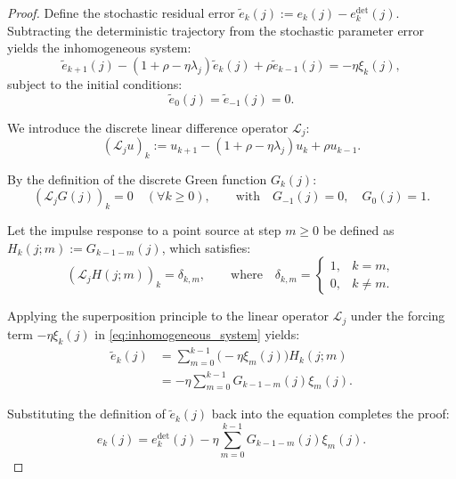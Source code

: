 \documentclass[11pt]{article}
\begin{document}
\begin{proof}

Define the stochastic residual error $\tilde{e}_k(j) := e_k(j) - e_k^{\mathrm{det}}(j)$. Subtracting the deterministic trajectory from the stochastic parameter error yields the inhomogeneous system:
\begin{equation} \label{eq:inhomogeneous_system}
    \tilde{e}_{k+1}(j) - (1+\rho-\eta\lambda_j)\tilde{e}_k(j) + \rho\tilde{e}_{k-1}(j) = -\eta\xi_k(j),
\end{equation}
subject to the initial conditions:
\begin{equation*} \label{eq:zero_initial_conditions}
    \tilde{e}_0(j) = \tilde{e}_{-1}(j) = 0.
\end{equation*}

We introduce the discrete linear difference operator $\mathcal{L}_j$:
\begin{equation*}
    (\mathcal{L}_j u)_k := u_{k+1} - (1+\rho-\eta\lambda_j)u_k + \rho u_{k-1}.
\end{equation*}

By the definition of the discrete Green function $G_k(j)$:
\begin{equation*}
    (\mathcal{L}_j G(j))_k = 0 \quad (\forall k \ge 0), \qquad \text{with} \quad G_{-1}(j) = 0, \quad G_0(j) = 1.
\end{equation*}

Let the impulse response to a point source at step $m \ge 0$ be defined as $H_k(j; m) := G_{k-1-m}(j)$, which satisfies:
\begin{equation*}
    (\mathcal{L}_j H(j; m))_k = \delta_{k, m}, \qquad \text{where} \quad \delta_{k,m} = \begin{cases} 1, & k = m, \\ 0, & k \neq m. \end{cases}
\end{equation*}

Applying the superposition principle to the linear operator $\mathcal{L}_j$ under the forcing term $-\eta\xi_k(j)$ in \eqref{eq:inhomogeneous_system} yields:
\begin{align*}
    \tilde{e}_k(j) &= \sum_{m=0}^{k-1} \big(-\eta\xi_m(j)\big) H_k(j; m) \nonumber \\
    &= -\eta \sum_{m=0}^{k-1} G_{k-1-m}(j)\xi_m(j).
\end{align*}

Substituting the definition of $\tilde{e}_k(j)$ back into the equation completes the proof:
\begin{equation*}
    e_k(j) = e_k^{\mathrm{det}}(j) - \eta \sum_{m=0}^{k-1} G_{k-1-m}(j)\xi_m(j).
\end{equation*}
\end{proof}
\end{document}
